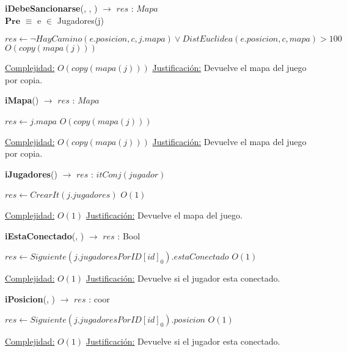\begin{algorithm}[H]{\textbf{iDebeSancionarse}(, , ) $\to$ $res$ : $Mapa$} 
\\
	{$\textbf{Pre}$ $\equiv$ e $\in$ Jugadores(j)}
	\begin{algorithmic}
		\State $res \gets \neg HayCamino(e.posicion, c, j.mapa) \lor DistEuclidea(e.posicion, c, mapa) > 100 $ \Comment $O(copy(mapa(j)))$
	
		\medskip
		\Statex \underline{Complejidad:} $O(copy(mapa(j)))$
		\Statex \underline{Justificación:} Devuelve el mapa del juego por copia.
    \end{algorithmic}
\end{algorithm}

\begin{algorithm}[H]{\textbf{iMapa}() $\to$ $res$ : $Mapa$} 
	{}
	\begin{algorithmic}
		\State $res \gets j.mapa $ \Comment $O(copy(mapa(j)))$
	
		\medskip
		\Statex \underline{Complejidad:} $O(copy(mapa(j)))$
		\Statex \underline{Justificación:} Devuelve el mapa del juego por copia.
    \end{algorithmic}
\end{algorithm}

\begin{algorithm}[H]{\textbf{iJugadores}() $\to$ $res$ : $itConj(jugador)$} 
	{}
	\begin{algorithmic}
		\State $res \gets CrearIt(j.jugadores) $ \Comment $O(1)$
	
		\medskip
		\Statex \underline{Complejidad:} $O(1)$
		\Statex \underline{Justificación:} Devuelve el mapa del juego.
    \end{algorithmic}
\end{algorithm}

\begin{algorithm}[H]{\textbf{iEstaConectado}(, ) $\to$ $res$ : Bool} 
	{}
	\begin{algorithmic}
		\State $res \gets Siguiente(j.jugadoresPorID[id]_0).estaConectado $ \Comment $O(1)$
	
		\medskip
		\Statex \underline{Complejidad:} $O(1)$
		\Statex \underline{Justificación:} Devuelve si el jugador esta conectado.
    \end{algorithmic}
\end{algorithm}

\begin{algorithm}[H]{\textbf{iPosicion}(, ) $\to$ $res$ : coor} 
	{}
	\begin{algorithmic}
		\State $res \gets Siguiente(j.jugadoresPorID[id]_0).posicion $ \Comment $O(1)$
	
		\medskip
		\Statex \underline{Complejidad:} $O(1)$
		\Statex \underline{Justificación:} Devuelve si el jugador esta conectado.
    \end{algorithmic}
\end{algorithm}


